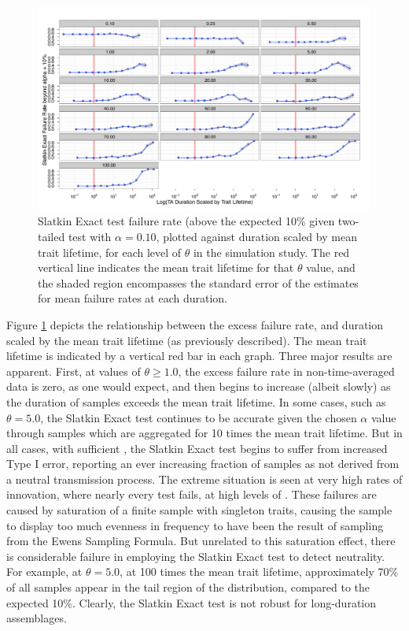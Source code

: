 \begin{figure}
	\includegraphics[angle=90, scale=0.75]{graphics/timeaveraging/slatkin-test-theta-0_1-100-100-5k-40k-failure-means-with-abline-labels.pdf}
	\caption{Slatkin Exact test failure rate (above the expected 10\% given two-tailed test with $\alpha = 0.10$, plotted against \timeav duration scaled by mean trait lifetime, for each level of $\theta$ in the simulation study. The red vertical line indicates the mean trait lifetime for that $\theta$ value, and the shaded region encompasses the standard error of the estimates for mean failure rates at each duration.}
	\label{fig:extra-slatkin-failures-by-scaled-duration}
\end{figure}

Figure \ref{fig:extra-slatkin-failures-by-scaled-duration} depicts the relationship between the excess failure rate, and \timeav duration scaled by the mean trait lifetime (as previously described).  The mean trait lifetime is indicated by a vertical red bar in each graph.  Three major results are apparent.  First, at values of $\theta \geq 1.0$, the excess failure rate in non-time-averaged data is zero, as one would expect, and then begins to increase (albeit slowly) as the \timeav duration of samples exceeds the mean trait lifetime.  In some cases, such as $\theta = 5.0$, the Slatkin Exact test continues to be accurate given the chosen $\alpha$ value through samples which are aggregated for 10 times the mean trait lifetime.  But in all cases, with sufficient \timeav, the Slatkin Exact test begins to suffer from increased Type I error, reporting an ever increasing fraction of samples as not derived from a neutral transmission process.  The extreme situation is seen at very high rates of innovation, where nearly every test fails, at high levels of \timeav.  These failures are caused by saturation of a finite sample with singleton traits, causing the sample to display too much evenness in frequency to have been the result of sampling from the Ewens Sampling Formula.  But unrelated to this saturation effect, there is considerable failure in employing the Slatkin Exact test to detect neutrality.  For example, at $\theta = 5.0$, at 100 times the mean trait lifetime, approximately 70\% of all samples appear in the tail region of the distribution, compared to the expected 10\%.  Clearly, the Slatkin Exact test is not robust for long-duration assemblages.    

